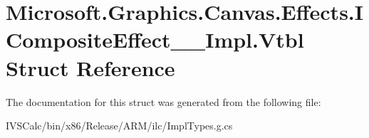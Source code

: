 \hypertarget{struct_microsoft_1_1_graphics_1_1_canvas_1_1_effects_1_1_i_composite_effect_____impl_1_1_vtbl}{}\section{Microsoft.\+Graphics.\+Canvas.\+Effects.\+I\+Composite\+Effect\+\_\+\+\_\+\+Impl.\+Vtbl Struct Reference}
\label{struct_microsoft_1_1_graphics_1_1_canvas_1_1_effects_1_1_i_composite_effect_____impl_1_1_vtbl}


The documentation for this struct was generated from the following file\+:\begin{DoxyCompactItemize}
\item 
I\+V\+S\+Calc/bin/x86/\+Release/\+A\+R\+M/ilc/Impl\+Types.\+g.\+cs\end{DoxyCompactItemize}
